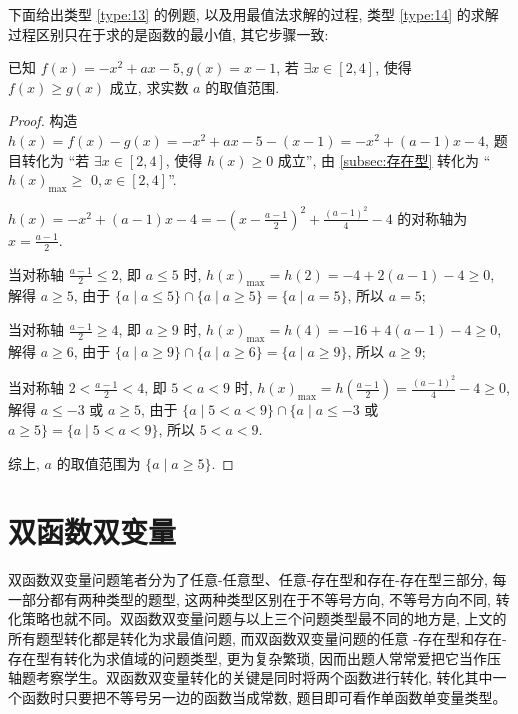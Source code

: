 下面给出类型 \ref{type:13} 的例题, 以及用最值法求解的过程, 类型 \ref{type:14} 的求解过程区别只在于求的是函数的最小值, 其它步骤一致:

\begin{variation}\label{variation:2.1.8}
  已知 \(f(x)  =  -{x}^{2} + {ax} -5, g(x)  = x -1\), 若 \(\exists x \in  \left\lbrack  {2, 4}\right\rbrack\), 使得 \(f(x)  \geq  g(x)\) 成立, 求实数 \(a\) 的取值范围.
\end{variation}

\begin{proof}
  构造 \(h(x)  = f(x)  -g(x)  =  -{x}^{2} + {ax} -5 -\left( {x -1}\right)  =  -{x}^{2} + \left( {a -1}\right) x -4\), 题目转化为 “若 \(\exists x \in  \left\lbrack  {2, 4}\right\rbrack\), 使得 \(h(x)  \geq  0\) 成立”, 由 \ref{subsec:存在型} 转化为 “\(h{(x) }_{\max } \geq\)  \(0, x \in  {\left\lbrack  2, 4\right\rbrack  }\)”.

\(h(x)  =  -{x}^{2} + \left( {a -1}\right) x -4 =  -{\left( x -\frac{a -1}{2}\right) }^{2} + \frac{{\left( a -1\right) }^{2}}{4} -4\) 的对称轴为 \(x = \frac{a -1}{2}\).

当对称轴 \(\frac{a -1}{2} \leq  2\), 即 \(a \leq  5\) 时, \(h{(x) }_{\max } = h\left( 2\right)  =  -4 + 2\left( {a -1}\right)  -4 \geq  0\), 解得 \(a \geq  5\), 由于 \(\{ a \mid  a \leq  5\}  \cap  \{ a \mid  a \geq  5\}  = \{ a \mid  a = 5\}\), 所以 \(a = 5\);

当对称轴 \(\frac{a -1}{2} \geq  4\), 即 \(a \geq  9\) 时, \(h{(x) }_{\max } = h\left( 4\right)  =  -{16} + 4\left( {a -1}\right)  -4 \geq  0\), 解得 \(a \geq  6\), 由于 \(\{ a \mid  a \geq  9\}  \cap  \{ a \mid  a \geq  6\}  = \{ a \mid  a \geq  9\}\), 所以 \(a \geq  9\);

当对称轴 \(2 < \frac{a -1}{2} < 4\), 即 \(5 < a < 9\) 时, \(h{(x) }_{\max } = h\left( \frac{a -1}{2}\right)  = \frac{{\left( a -1\right) }^{2}}{4} -4 \geq  0\), 解得 \(a \leq   -3\) 或 \(a \geq  5\), 由于 \(\{ a \mid  5 < a < 9\}  \cap  \{ a \mid  a \leq   -3\) 或 \(a \geq  5\}  = \{ a \mid  5 < a < 9\}\), 所以 \(5 < a < 9\).

综上, \(a\) 的取值范围为 \(\{ a \mid  a \geq  5\}\).
\end{proof}


\section{双函数双变量}
双函数双变量问题笔者分为了任意-任意型、任意-存在型和存在-存在型三部分, 每一部分都有两种类型的题型, 这两种类型区别在于不等号方向, 不等号方向不同, 转化策略也就不同。双函数双变量问题与以上三个问题类型最不同的地方是, 上文的所有题型转化都是转化为求最值问题, 而双函数双变量问题的任意 -存在型和存在-存在型有转化为求值域的问题类型, 更为复杂繁琐, 因而出题人常常爱把它当作压轴题考察学生。双函数双变量转化的关键是同时将两个函数进行转化, 转化其中一个函数时只要把不等号另一边的函数当成常数, 题目即可看作单函数单变量类型。


